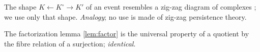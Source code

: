\begin{description}[leftmargin=1.2em,itemsep=3pt]
\item[Zig-zag and filtered structures.] The shape $K\leftarrow K^\circ\to K'$ of an event resembles a zig-zag diagram of complexes \cite{CarlssonDeSilva2010}; we use only that shape. \emph{Analogy}; no use is made of zig-zag persistence theory.
\item[Information-losing projections.] The factorization lemma \cref{lem:factor} is the universal property of a quotient by the fibre relation of a surjection; \emph{identical}.
\end{description}
